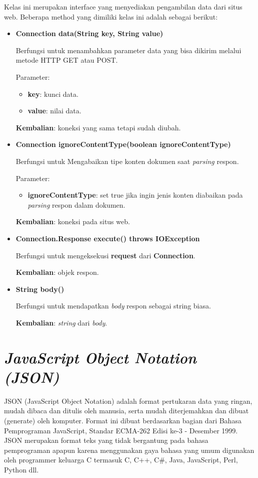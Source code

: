 Kelas ini merupakan interface yang menyediakan pengambilan data dari situs web. Beberapa method yang dimiliki kelas ini adalah sebagai berikut:
\begin{itemize}
	\item \textbf{Connection data(String key, String value)}
	
	Berfungsi untuk menambahkan parameter data yang bisa dikirim melalui metode HTTP GET atau POST.
	
	Parameter:
	\begin{itemize}
		\item \textbf{key}: kunci data.
		\item \textbf{value}: nilai data.
	\end{itemize}
	\textbf{Kembalian}: koneksi yang sama tetapi sudah diubah.
	
	\item \textbf{Connection ignoreContentType(boolean ignoreContentType)}
	
	Berfungsi untuk Mengabaikan tipe konten dokumen saat \textit{parsing} respon.
	
	Parameter:
	\begin{itemize}
		\item \textbf{ignoreContentType}: set true jika ingin jenis konten diabaikan pada \textit{parsing} respon dalam dokumen.
	\end{itemize}
	\textbf{Kembalian}: koneksi pada situs web.
	
	\item \textbf{Connection.Response execute() throws IOException}
	
	Berfungsi untuk mengeksekusi \textbf{request} dari \textbf{Connection}.
	
	\textbf{Kembalian}: objek respon.
	
	\item \textbf{String body()}
	
	Berfungsi untuk mendapatkan \textit{body} respon sebagai string biasa.
	
	\textbf{Kembalian}: \textit{string} dari \textit{body}.
\end{itemize}

\section{\textit{JavaScript Object Notation (JSON)}}
\label{sec:json}
JSON (JavaScript Object Notation) adalah format pertukaran data yang ringan, mudah dibaca dan ditulis oleh manusia, serta mudah diterjemahkan dan dibuat (generate) oleh komputer. Format ini dibuat berdasarkan bagian dari Bahasa Pemprograman JavaScript, Standar ECMA-262 Edisi ke-3 - Desember 1999. JSON merupakan format teks yang tidak bergantung pada bahasa pemprograman apapun karena menggunakan gaya bahasa yang umum digunakan oleh programmer keluarga C termasuk C, C++, C\#, Java, JavaScript, Perl, Python dll\cite{ecmainternational2013}.


